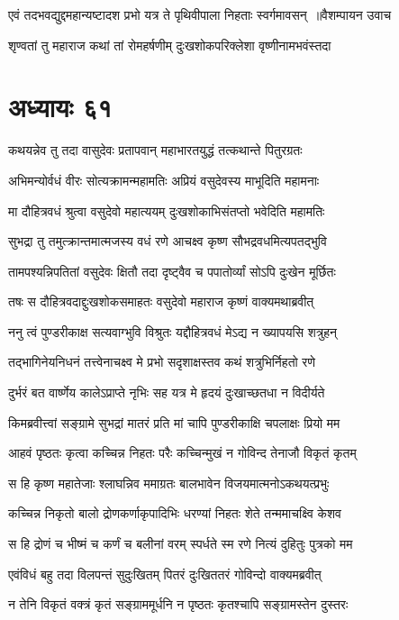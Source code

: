\threelineshloka
{एवं तदभवद्युद्दमहान्यष्टादश प्रभो}
{यत्र ते पृथिवीपाला निहताः स्वर्गमावसन् ॥वैशम्पायन उवाच}
{}


\twolineshloka
{शृण्वतां तु महाराज कथां तां रोमहर्षणीम्}
{दुःखशोकपरिक्लेशा वृष्णीनामभवंस्तदा}


\chapter{अध्यायः ६१}
\twolineshloka
{कथयन्नेव तु तदा वासुदेवः प्रतापवान्}
{महाभारतयुद्धं तत्कथान्ते पितुरग्रतः}


\twolineshloka
{अभिमन्योर्वधं वीरः सोत्यक्रामन्महामतिः}
{अप्रियं वसुदेवस्य माभूदिति महामनाः}


\twolineshloka
{मा दौहित्रवधं श्रुत्वा वसुदेवो महात्ययम्}
{दुःखशोकाभिसंतप्तो भवेदिति महामतिः}


\twolineshloka
{सुभद्रा तु तमुत्क्रान्तमात्मजस्य वधं रणे}
{आचक्ष्व कृष्ण सौभद्रवधमित्यपतद्भुवि}


\twolineshloka
{तामपश्यन्निपतितां वसुदेवः क्षितौ तदा}
{दृष्ट्वैव च पपातोर्व्यां सोऽपि दुःखेन मूर्छितः}


\twolineshloka
{तषः स दौहित्रवदाद्दुःखशोकसमाहतः}
{वसुदेवो महाराज कृष्णं वाक्यमथाब्रवीत्}


\twolineshloka
{ननु त्वं पुण्डरीकाक्ष सत्यवाग्भुवि विश्रुतः}
{यद्दौहित्रवधं मेऽद्य न ख्यापयसि शत्रुहन्}


\threelineshloka
{तद्भागिनेयनिधनं तत्त्वेनाचक्ष्व मे प्रभो}
{सदृशाक्षस्तव कथं शत्रुभिर्निहतो रणे}
{}


\twolineshloka
{दुर्भरं बत वार्ष्णेय कालेऽप्राप्ते नृभिः सह}
{यत्र मे हृदयं दुःखाच्छतधा न विदीर्यते}


\twolineshloka
{किमब्रवीत्त्वां सङ्ग्रामे सुभद्रां मातरं प्रति}
{मां चापि पुण्डरीकाक्षि चपलाक्षः प्रियो मम}


\twolineshloka
{आहवं पृष्ठतः कृत्वा कच्चिन्न निहतः परैः}
{कच्चिन्मुखं न गोविन्द तेनाजौ विकृतं कृतम्}


\threelineshloka
{स हि कृष्ण महातेजाः श्लाघन्निव ममाग्रतः}
{बालभावेन विजयमात्मनोऽकथयत्प्रभुः}
{}


\twolineshloka
{कच्चिन्न निकृतो बालो द्रोणकर्णाकृपादिभिः}
{धरण्यां निहतः शेते तन्ममाचक्ष्वि केशव}


\twolineshloka
{स हि द्रोणं च भीष्मं च कर्णं च बलीनां वरम्}
{स्पर्धते स्म रणे नित्यं दुहितुः पुत्रको मम}


\twolineshloka
{एवंविधं बहु तदा विलपन्तं सुदुःखितम्}
{पितरं दुःखिततरं गोविन्दो वाक्यमब्रवीत्}


\twolineshloka
{न तेनि विकृतं वक्त्रं कृतं सङ्ग्राममूर्धनि}
{न पृष्ठतः कृतश्चापि सङ्ग्रामस्तेन दुस्तरः}


